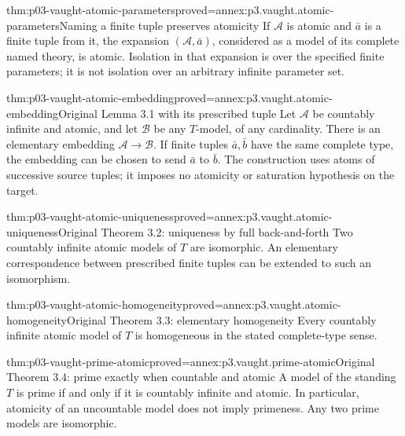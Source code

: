 \begin{hblemma}{thm:p03-vaught-atomic-parameters}{proved=annex:p3.vaught.atomic-parameters}{Naming a finite tuple preserves atomicity}
If \(\mathcal A\) is atomic and \(\bar a\) is a finite tuple from it,
the expansion \((\mathcal A,\bar a)\), considered as a model of its
complete named theory, is atomic. Isolation in that expansion is
over the specified finite parameters; it is not isolation over
an arbitrary infinite parameter set.
\end{hblemma}

\begin{hblemma}{thm:p03-vaught-atomic-embedding}{proved=annex:p3.vaught.atomic-embedding}{Original Lemma 3.1 with its prescribed tuple}
Let \(\mathcal A\) be countably infinite and atomic, and let
\(\mathcal B\) be any \(T\)-model, of any cardinality.
There is an elementary embedding \(\mathcal A\to\mathcal B\).
If finite tuples \(\bar a,\bar b\) have the same complete type,
the embedding can be chosen to send \(\bar a\) to \(\bar b\).
The construction uses atoms of successive source tuples; it imposes
no atomicity or saturation hypothesis on the target.
\end{hblemma}

\begin{hbtheorem}{thm:p03-vaught-atomic-uniqueness}{proved=annex:p3.vaught.atomic-uniqueness}{Original Theorem 3.2: uniqueness by full back-and-forth}
Two countably infinite atomic models of \(T\) are isomorphic.
An elementary correspondence between prescribed finite tuples
can be extended to such an isomorphism.
\end{hbtheorem}

\begin{hbtheorem}{thm:p03-vaught-atomic-homogeneity}{proved=annex:p3.vaught.atomic-homogeneity}{Original Theorem 3.3: elementary homogeneity}
Every countably infinite atomic model of \(T\) is homogeneous
in the stated complete-type sense.
\end{hbtheorem}

\begin{hbtheorem}{thm:p03-vaught-prime-atomic}{proved=annex:p3.vaught.prime-atomic}{Original Theorem 3.4: prime exactly when countable and atomic}
A model of the standing \(T\) is prime if and only if it is
countably infinite and atomic.
In particular, atomicity of an uncountable model does not imply primeness.
Any two prime models are isomorphic.
\end{hbtheorem}

